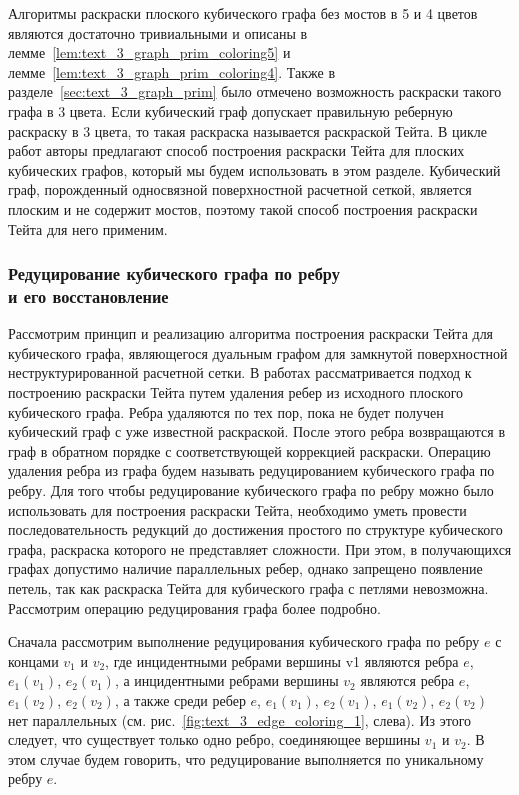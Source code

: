 Алгоритмы раскраски плоского кубического графа без мостов в 5 и 4 цветов являются достаточно тривиальными и описаны в лемме~\ref{lem:text_3_graph_prim_coloring5} и лемме~\ref{lem:text_3_graph_prim_coloring4}.
Также в разделе~\ref{sec:text_3_graph_prim} было отмечено возможность раскраски такого графа в 3 цвета.
Если кубический граф допускает правильную реберную раскраску в 3 цвета, то такая раскраска называется раскраской Тейта\label{term:coloring_tait}.
В цикле работ \cite{Kurapov2018,Kurapov2020,Kurapov2020Mono} авторы предлагают способ построения раскраски Тейта для плоских кубических графов, который мы будем использовать в этом разделе.
Кубический граф, порожденный односвязной поверхностной расчетной сеткой, является плоским и не содержит мостов, поэтому такой способ построения раскраски Тейта для него применим.

\subsubsection{Редуцирование кубического графа по ребру \\ и его восстановление}

Рассмотрим принцип и реализацию алгоритма построения раскраски Тейта для кубического графа, являющегося дуальным графом для замкнутой поверхностной неструктурированной расчетной сетки.
В работах \cite{Kurapov2018,Kurapov2020} рассматривается подход к построению раскраски Тейта путем удаления ребер из исходного плоского кубического графа.
Ребра удаляются по тех пор, пока не будет получен кубический граф с уже известной раскраской.
После этого ребра возвращаются в граф в обратном порядке с соответствующей коррекцией раскраски.
Операцию удаления ребра из графа будем называть редуцированием кубического графа по ребру.
Для того чтобы редуцирование кубического графа по ребру можно было использовать для построения раскраски Тейта, необходимо уметь провести последовательность редукций до достижения простого по структуре кубического графа, раскраска которого не представляет сложности.
При этом, в получающихся графах допустимо наличие параллельных ребер, однако запрещено появление петель, так как раскраска Тейта для кубического графа с петлями невозможна.
Рассмотрим операцию редуцирования графа более подробно.

Сначала рассмотрим выполнение редуцирования кубического графа по ребру $e$ с концами $v_1$ и $v_2$, где инцидентными ребрами вершины v1 являются ребра $e$, $e_1(v_1)$, $e_2(v_1)$, а инцидентными ребрами вершины $v_2$ являются ребра $e$, $e_1(v_2)$, $e_2(v_2)$, а также среди ребер $e$, $e_1(v_1)$, $e_2(v_1)$, $e_1(v_2)$, $e_2(v_2)$ нет параллельных (см. рис.~\ref{fig:text_3_edge_coloring_1}, слева).
Из этого следует, что существует только одно ребро, соединяющее вершины $v_1$ и $v_2$.
В этом случае будем говорить, что редуцирование выполняется по уникальному ребру $e$.

